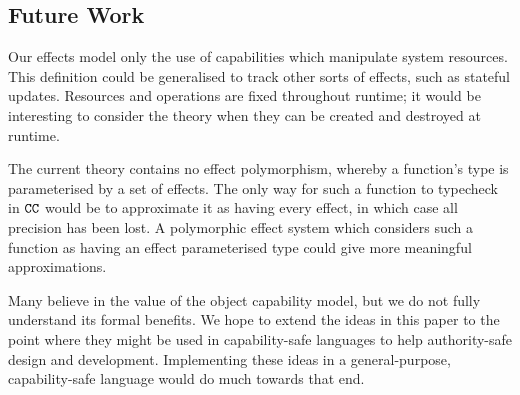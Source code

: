 \subsection{Future Work}

Our effects model only the use of capabilities which manipulate system resources. This definition could be generalised to track other sorts of effects, such as stateful updates. Resources and operations are fixed throughout runtime; it would be interesting to consider the theory when they can be created and destroyed at runtime.

The current theory contains no effect polymorphism, whereby a function's type is parameterised by a set of effects. The only way for such a function to typecheck in $\mathtt{CC}$ would be to approximate it as having every effect, in which case all precision has been lost. A polymorphic effect system which considers such a function as having an effect parameterised type could give more meaningful approximations.

Many believe in the value of the object capability model, but we do not fully understand its formal benefits. We hope to extend the ideas in this paper to the point where they might be used in capability-safe languages to help authority-safe design and development. Implementing these ideas in a general-purpose, capability-safe language would do much towards that end.







